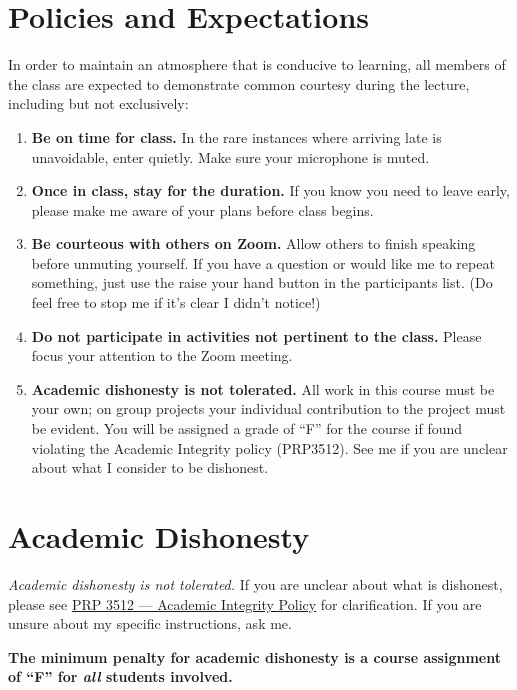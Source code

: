 \documentclass[11pt,letterpaper]{article}
\begin{document}
\section{Policies and Expectations}
In order to maintain an atmosphere that is conducive to learning, all members
of the class are expected to demonstrate common courtesy during the lecture,
including but not exclusively:
\begin{enumerate}
	\item \textbf{Be on time for class.} In the rare instances where
		arriving late is unavoidable, enter quietly. Make sure your
		microphone is muted.
	\item \textbf{Once in class, stay for the duration.} If you know you
		need to leave early, please make me aware of your plans before
		class begins.
	\item \textbf{Be courteous with others on Zoom.} Allow others to finish
		speaking before unmuting yourself. If you have a question or
		would like me to repeat something, just use the raise your hand
		button in the participants list. (Do feel free to stop me if
		it's clear I didn't notice!)
	\item \textbf{Do not participate in activities not pertinent to the
		class.} Please focus your attention to the Zoom meeting.
	\item \textbf{Academic dishonesty is not tolerated.} All work in this
		course must be your own; on group projects your individual
		contribution to the project must be evident. You will be
		assigned a grade of ``F'' for the course if found violating the
		Academic Integrity policy (PRP3512).  See me if you are unclear
		about what I consider to be dishonest.
\end{enumerate}



\section{Academic Dishonesty}
\emph{Academic dishonesty is not tolerated.} If you are unclear about what is
dishonest, please see
\href{https://intranet.bloomu.edu/policies_procedures}{PRP 3512 --- Academic
Integrity Policy} for clarification. If you are unsure about my specific
instructions, ask me.

\begin{mdframed}
	\centering\bfseries The minimum penalty for academic dishonesty is a
	course assignment of ``F'' for \emph{all} students involved.
\end{mdframed}
\end{document}
